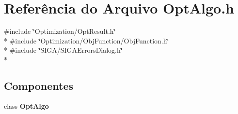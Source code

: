 \section{Referência do Arquivo Opt\+Algo.\+h}
\label{_opt_algo_8h}
{\ttfamily \#include \char`\"{}Optimization/\+Opt\+Result.\+h\char`\"{}}\\*
{\ttfamily \#include \char`\"{}Optimization/\+Obj\+Function/\+Obj\+Function.\+h\char`\"{}}\\*
{\ttfamily \#include \char`\"{}S\+I\+G\+A/\+S\+I\+G\+A\+Errors\+Dialog.\+h\char`\"{}}\\*
\subsection*{Componentes}
\begin{DoxyCompactItemize}
\item 
class {\bf Opt\+Algo}
\end{DoxyCompactItemize}
